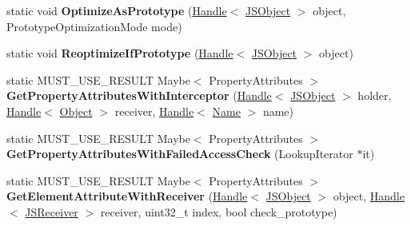 \begin{DoxyCompactItemize}
\item 
\hypertarget{classv8_1_1internal_1_1_j_s_object_a76ec634f4df2b1f5b13ffd61ee7a695b}{}static void {\bfseries Optimize\+As\+Prototype} (\hyperlink{classv8_1_1internal_1_1_handle}{Handle}$<$ \hyperlink{classv8_1_1internal_1_1_j_s_object}{J\+S\+Object} $>$ object, Prototype\+Optimization\+Mode mode)\label{classv8_1_1internal_1_1_j_s_object_a76ec634f4df2b1f5b13ffd61ee7a695b}

\item 
\hypertarget{classv8_1_1internal_1_1_j_s_object_a342b5c9cabbf740064cf94830b92b330}{}static void {\bfseries Reoptimize\+If\+Prototype} (\hyperlink{classv8_1_1internal_1_1_handle}{Handle}$<$ \hyperlink{classv8_1_1internal_1_1_j_s_object}{J\+S\+Object} $>$ object)\label{classv8_1_1internal_1_1_j_s_object_a342b5c9cabbf740064cf94830b92b330}

\item 
\hypertarget{classv8_1_1internal_1_1_j_s_object_acf43bd6dba347fb53dac3083605e1354}{}static M\+U\+S\+T\+\_\+\+U\+S\+E\+\_\+\+R\+E\+S\+U\+L\+T Maybe$<$ Property\+Attributes $>$ {\bfseries Get\+Property\+Attributes\+With\+Interceptor} (\hyperlink{classv8_1_1internal_1_1_handle}{Handle}$<$ \hyperlink{classv8_1_1internal_1_1_j_s_object}{J\+S\+Object} $>$ holder, \hyperlink{classv8_1_1internal_1_1_handle}{Handle}$<$ \hyperlink{classv8_1_1internal_1_1_object}{Object} $>$ receiver, \hyperlink{classv8_1_1internal_1_1_handle}{Handle}$<$ \hyperlink{classv8_1_1internal_1_1_name}{Name} $>$ name)\label{classv8_1_1internal_1_1_j_s_object_acf43bd6dba347fb53dac3083605e1354}

\item 
\hypertarget{classv8_1_1internal_1_1_j_s_object_afef16a884ae1a10b9e5893f60be19b28}{}static M\+U\+S\+T\+\_\+\+U\+S\+E\+\_\+\+R\+E\+S\+U\+L\+T Maybe$<$ Property\+Attributes $>$ {\bfseries Get\+Property\+Attributes\+With\+Failed\+Access\+Check} (Lookup\+Iterator $\ast$it)\label{classv8_1_1internal_1_1_j_s_object_afef16a884ae1a10b9e5893f60be19b28}

\item 
\hypertarget{classv8_1_1internal_1_1_j_s_object_a5b7028b96ffe82b0b0c81f8cfbe38f5b}{}static M\+U\+S\+T\+\_\+\+U\+S\+E\+\_\+\+R\+E\+S\+U\+L\+T Maybe$<$ Property\+Attributes $>$ {\bfseries Get\+Element\+Attribute\+With\+Receiver} (\hyperlink{classv8_1_1internal_1_1_handle}{Handle}$<$ \hyperlink{classv8_1_1internal_1_1_j_s_object}{J\+S\+Object} $>$ object, \hyperlink{classv8_1_1internal_1_1_handle}{Handle}$<$ \hyperlink{classv8_1_1internal_1_1_j_s_receiver}{J\+S\+Receiver} $>$ receiver, uint32\+\_\+t index, bool check\+\_\+prototype)\label{classv8_1_1internal_1_1_j_s_object_a5b7028b96ffe82b0b0c81f8cfbe38f5b}


\end{DoxyCompactItemize}
